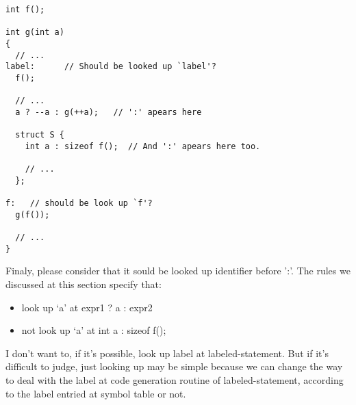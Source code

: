 \begin{verbatim}
int f();

int g(int a)
{
  // ...
label:      // Should be looked up `label'?
  f();

  // ...
  a ? --a : g(++a);   // ':' apears here

  struct S {
    int a : sizeof f();  // And ':' apears here too.

    // ...
  };

f:   // should be look up `f'?
  g(f());

  // ...
}
\end{verbatim}
Finaly, please consider that it sould be looked up identifier
before ':'.
The rules we discussed at this section specify that:
\begin{itemize}
\item
look up `a' at expr1 ? a : expr2 
\item
not look up `a' at int a : sizeof f();
\end{itemize}

I don't want to, if it's possible, look up label at
labeled-statement. But if it's difficult to judge,
just looking up may be simple because
we can change the way to deal with the label
at code generation routine of labeled-statement,
according to the label entried at symbol table or not.
